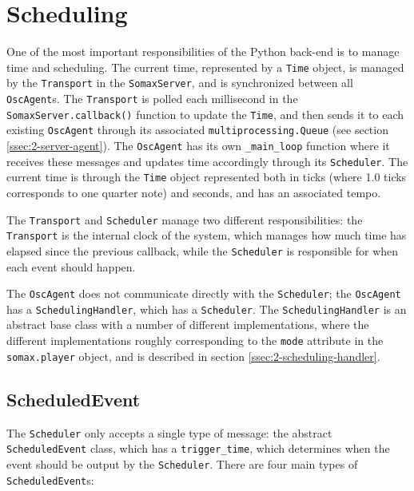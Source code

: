 \section{Scheduling}\label{ssec:2-scheduling}
One of the most important responsibilities of the Python back-end is to manage time and scheduling. The current time, represented by a \texttt{Time} object, is managed by the \texttt{Transport} in the \texttt{SomaxServer}, and is synchronized between all \texttt{OscAgent}s. The \texttt{Transport} is polled each millisecond in the \texttt{SomaxServer.callback()} function to update the \texttt{Time}, and then sends it to each existing \texttt{OscAgent} through its associated \texttt{multiprocessing.Queue} (see section \ref{ssec:2-server-agent}). The \texttt{OscAgent} has its own \texttt{\_main\_loop} function where it receives these messages and updates time accordingly through its \texttt{Scheduler}. The current time is through the \texttt{Time} object represented both in ticks (where 1.0 ticks corresponds to one quarter note) and seconds, and has an associated tempo.

The \texttt{Transport} and \texttt{Scheduler} manage two different responsibilities: the \texttt{Transport} is the internal clock of the system, which manages how much time has elapsed since the previous callback, while the \texttt{Scheduler} is responsible for when each event should happen.

The \texttt{OscAgent} does not communicate directly with the \texttt{Scheduler}; the \texttt{OscAgent} has a \texttt{SchedulingHandler}, which has a \texttt{Scheduler}. The \texttt{SchedulingHandler} is an abstract base class with a number of different implementations, where the different implementations roughly corresponding to the \texttt{mode} attribute in the \texttt{somax.player} object, and is described in section \ref{ssec:2-scheduling-handler}.



\subsection{ScheduledEvent}\label{ssec:2-scheduled-event}
The \texttt{Scheduler} only accepts a single type of message: the abstract \texttt{ScheduledEvent} class, which has a \texttt{trigger\_time}, which determines when the event should be output by the \texttt{Scheduler}. There are four main types of \texttt{ScheduledEvent}s:

